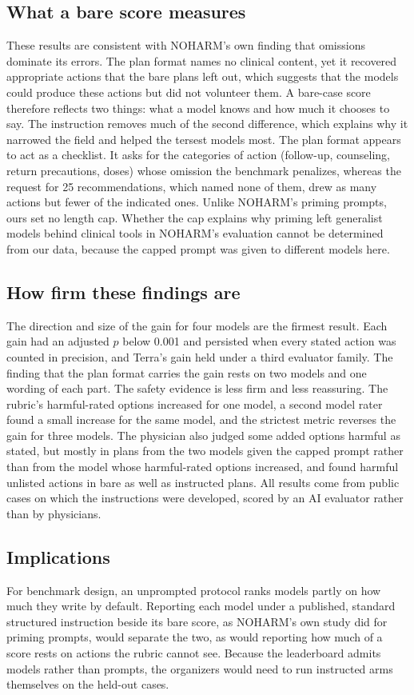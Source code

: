 \documentclass[11pt]{article}
\begin{document}
\subsection*{What a bare score measures}
These results are consistent with NOHARM's own finding that omissions dominate its
errors.\citep{wu2025noharm} The plan format names no clinical content, yet it recovered appropriate
actions that the bare plans left out, which suggests that the models could produce these actions
but did not volunteer them. A bare-case score therefore reflects two things: what a model knows and
how much it chooses to say. The instruction removes much of the second difference, which explains
why it narrowed the field and helped the tersest models most. The plan format appears to act as a
checklist. It asks for the categories of action (follow-up, counseling, return precautions, doses)
whose omission the benchmark penalizes, whereas the request for 25 recommendations, which named none
of them, drew as many actions but fewer of the indicated ones. Unlike NOHARM's priming prompts, ours
set no length cap. Whether the cap explains why priming left generalist models behind clinical tools
in NOHARM's evaluation\citep{wu2025noharm} cannot be determined from our data, because the capped
prompt was given to different models here.

\subsection*{How firm these findings are}
The direction and size of the gain for four models are the firmest result. Each gain had an
adjusted $p$ below 0.001 and persisted when every stated action was counted in precision, and
Terra's gain held under a third evaluator family. The finding that the plan format carries the gain
rests on two models and one wording of each part. The safety evidence is less firm and
less reassuring. The rubric's harmful-rated options increased for one model, a second model rater
found a small increase for the same model, and the strictest metric reverses the gain for three
models. The physician also judged some added options harmful as stated, but mostly in plans from the two
models given the capped prompt rather than from the model whose harmful-rated options increased, and
found harmful unlisted actions in bare as well as instructed plans. All results come from public cases on which the instructions were developed, scored by an AI
evaluator rather than by physicians.

\subsection*{Implications}
For benchmark design, an unprompted protocol ranks models partly on how much they write by default.
Reporting each model under a published, standard structured instruction beside its bare score, as
NOHARM's own study did for priming prompts, would separate the two, as would reporting how much of a
score rests on actions the rubric cannot see. Because the leaderboard admits models rather than
prompts, the organizers would need to run instructed arms themselves on the held-out cases.
\end{document}
